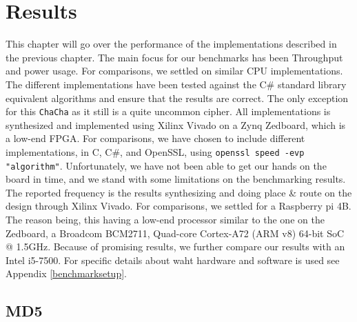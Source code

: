 \documentclass[a4paper, openany]{book}
\begin{document}
\chapter{Results}
\label{sec:org7872bbc}
This chapter will go over the performance of the implementations described in the previous chapter.
The main focus for our benchmarks has been Throughput and power usage. For comparisons, we settled on similar CPU implementations.
The different implementations have been tested against the C\# standard library equivalent algorithms and ensure that the results are correct.
The only exception for this \texttt{ChaCha} as it still is a quite uncommon cipher.
All implementations is synthesized and implemented using Xilinx Vivado on a Zynq Zedboard, which is a low-end FPGA.
For comparisons, we have chosen to include different implementations, in C, C\#, and OpenSSL, using \texttt{openssl speed -evp "algorithm"}.
Unfortunately, we have not been able to get our hands on the board in time, and we stand with some limitations on the benchmarking results.
The reported frequency is the results synthesizing and doing place \& route on the design through Xilinx Vivado. For comparisons, we settled for a Raspberry pi 4B.
The reason being, this having a low-end processor similar to the one on the Zedboard, a Broadcom BCM2711, Quad-core Cortex-A72 (ARM v8) 64-bit SoC @ 1.5GHz.
Because of promising results, we further compare our results with an Intel i5-7500. For specific details about waht hardware and software is used see Appendix \ref{benchmarksetup}.

\section{MD5}
\label{sec:org27b20d0}
\label{sec:MD5performance}
\end{document}
